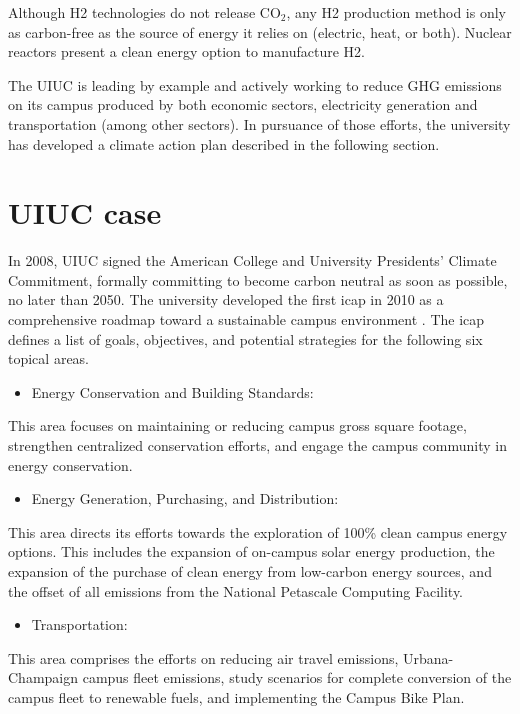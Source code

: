 \documentclass[11pt,letterpaper]{article}
\begin{document}
Although \gls{H2} technologies do not release CO$_2$, any \gls{H2} production method is only as carbon-free as the source of energy it relies on (electric, heat, or both).
Nuclear reactors present a clean energy option to manufacture \gls{H2}.

The \gls{UIUC} is leading by example and actively working to reduce \gls{GHG} emissions on its campus produced by both economic sectors, electricity generation and transportation (among other sectors).
In pursuance of those efforts, the university has developed a climate action plan described in the following section.

\section{\gls{UIUC} case}
In 2008, \gls{UIUC} signed the American College and University Presidents' Climate Commitment, formally committing to become carbon neutral as soon as possible, no later than 2050.
The university developed the first \gls{icap} in 2010 as a comprehensive roadmap toward a sustainable campus environment \cite{university_of_illinois_at_urbana-champaign_illlinois_2015}.
The \gls{icap} defines a list of goals, objectives, and potential strategies for the following six topical areas.

\begin{itemize}
	\item Energy Conservation and Building Standards:
\end{itemize}
This area focuses on maintaining or reducing campus gross square footage, strengthen centralized conservation efforts, and engage the campus community in energy conservation.

\begin{itemize}
	\item Energy Generation, Purchasing, and Distribution:
\end{itemize}
This area directs its efforts towards the exploration of 100\% clean campus energy options.
This includes the expansion of on-campus solar energy production, the expansion of the purchase of clean energy from low-carbon energy sources, and the offset of all emissions from the National Petascale Computing Facility.

\begin{itemize}
	\item Transportation:
\end{itemize}
This area comprises the efforts on reducing air travel emissions, Urbana-Champaign campus fleet emissions, study scenarios for complete conversion of the campus fleet to renewable fuels, and implementing the Campus Bike Plan.
\end{document}
